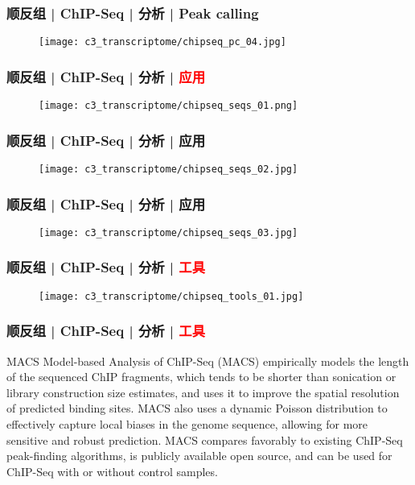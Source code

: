 \begin{frame}
  \frametitle{顺反组 | ChIP-Seq | 分析 | Peak calling}
  \begin{figure}
    \centering
    \texttt{[image: c3\_transcriptome/chipseq\_pc\_04.jpg]}
  \end{figure}
\end{frame}

\begin{frame}
  \frametitle{顺反组 | ChIP-Seq | 分析 | \textcolor{red}{应用}}
  \begin{figure}
    \centering
    \texttt{[image: c3\_transcriptome/chipseq\_seqs\_01.png]}
  \end{figure}
\end{frame}

\begin{frame}
  \frametitle{顺反组 | ChIP-Seq | 分析 | 应用}
  \begin{figure}
    \centering
    \texttt{[image: c3\_transcriptome/chipseq\_seqs\_02.jpg]}
  \end{figure}
\end{frame}

\begin{frame}
  \frametitle{顺反组 | ChIP-Seq | 分析 | 应用}
  \begin{figure}
    \centering
    \texttt{[image: c3\_transcriptome/chipseq\_seqs\_03.jpg]}
  \end{figure}
\end{frame}

\begin{frame}
  \frametitle{顺反组 | ChIP-Seq | 分析 | \textcolor{red}{工具}}
  \begin{figure}
    \centering
    \texttt{[image: c3\_transcriptome/chipseq\_tools\_01.jpg]}
  \end{figure}
\end{frame}

\begin{frame}
  \frametitle{顺反组 | ChIP-Seq | 分析 | \textcolor{red}{工具}}
  \begin{block}{MACS}
    Model-based Analysis of ChIP-Seq (MACS) empirically models the length of the sequenced ChIP fragments, which tends to be shorter than sonication or library construction size estimates, and uses it to improve the spatial resolution of predicted binding sites. MACS also uses a dynamic Poisson distribution to effectively capture local biases in the genome sequence, allowing for more sensitive and robust prediction. MACS compares favorably to existing ChIP-Seq peak-finding algorithms, is publicly available open source, and can be used for ChIP-Seq with or without control samples.
  \end{block}
\end{frame}

